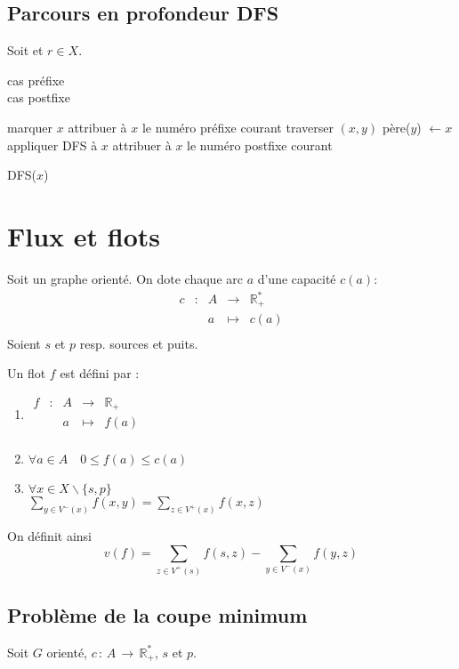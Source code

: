 \documentclass[a4paper, 8pt]{article}
\begin{document}
\begin{multicols*}{3}
\subsection*{Parcours en profondeur DFS}

Soit \GXA et $r\in X$.
\begin{flushright}
{\footnotesize
{\color{blue} cas préfixe} \\
{\color{red} cas postfixe}
}
\end{flushright}
\begin{algorithm}[H]
marquer $x$\;
{\color{blue} attribuer à $x$ le numéro préfixe courant}\;
{
	traverser $(x,y)$\;
	{
		père($y$) $\longleftarrow x$\;
		appliquer DFS à $x$\;
	}
}
{\color{red} attribuer à $x$ le numéro postfixe courant}\;
\caption{DFS($x$)}
\end{algorithm}

\section*{Flux et flots}

Soit \GXA un graphe orienté. On dote chaque arc $a$ d'une capacité $c(a)$:
\[
\begin{array}{cc|ccl}
c & : & A & \to & \mathbb{R}^*_+  \\
 & & a & \mapsto & c(a) \\
\end{array}
\]
Soient $s$ et $p$ resp. sources et puits.

Un flot $f$ est défini par : \begin{enumerate}
\item $
\begin{array}{cc|ccl} 
f & : & A & \to & \mathbb{R}_+  \\
 & & a & \mapsto & f(a)\\
\end{array}
$
\item $\forall a \in A\quad 0 \leqslant f(a) \leqslant c(a) $
\item $\forall x \in X\backslash\{s,p\}$\\ 
 $\displaystyle\sum_{y\in V^-(x)}{f(x,y)} = \sum_{z\in V^+(x)}{f(x,z)}$
\end{enumerate}

On définit ainsi
\[v(f) = \displaystyle\sum_{z\in V^+(s)}{f(s,z)} - \sum_{y\in V^-(x)}{f(y,z)} \]

\subsection*{Problème de la coupe minimum}
Soit $G$ orienté, $c\, :\, A\, \rightarrow\, \mathbb{R}^*_+$, $s$ et $p$.


\end{multicols*}
\end{document}
